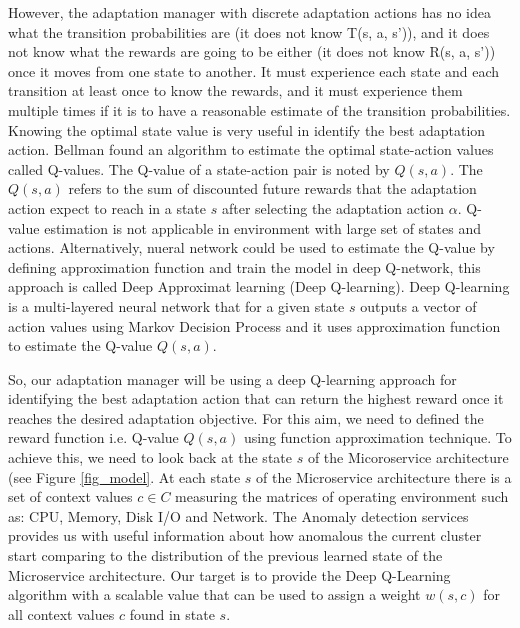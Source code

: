 \documentclass{ieeeaccess}
\begin{document}
However, the adaptation manager with discrete adaptation actions  has no idea what the transition probabilities are (it does not know T(s, a, s')), and it does not know what the rewards are going to be either (it does not know R(s, a, s')) once it moves from one state to another. It must experience each state and each transition at least once to know the rewards, and it must experience them multiple times if it is to have a reasonable estimate of the transition probabilities.  Knowing the optimal state value is very useful in identify the best adaptation action. Bellman \cite{bellman1957markovian} found an algorithm to estimate the optimal state-action values called Q-values. The Q-value of a state-action pair is noted by $Q(s,a)$. The $Q(s,a)$ refers to the sum of discounted future rewards that the adaptation action expect to reach in a state $s$ after selecting the adaptation action $\alpha$.  Q-value estimation is not applicable in environment with large set of states and actions. Alternatively, nueral network could be used to estimate the Q-value by defining approximation function and train the model in deep Q-network, this approach is called Deep Approximat learning (Deep Q-learning). Deep Q-learning is a multi-layered neural network that for a given state $s$ outputs a vector of action values using Markov Decision Process \cite{bellman1957markovian} and it uses approximation function to estimate the Q-value $Q(s, a)$. 

So, our adaptation manager will be  using a deep Q-learning approach for identifying the best adaptation action that can return the highest reward once it reaches the desired adaptation objective. For this aim, we need to defined the reward function i.e. Q-value $Q(s,a)$ using function approximation technique. To achieve this, we need to look back at the state $s$ of the Micoroservice architecture (see Figure \ref{fig_model}. At each state $s$ of the Microservice architecture there is a set of context values $c \in C$ measuring the matrices of operating environment such as: CPU, Memory, Disk I/O and Network. The Anomaly detection services provides us with useful information about how anomalous the current cluster start comparing to the distribution of the previous learned state of the Microservice architecture. Our target is to provide the Deep Q-Learning algorithm with a scalable value that can be used to assign a weight $w(s,c)$ for all context values $c$ found in state $s$. 
\end{document}

